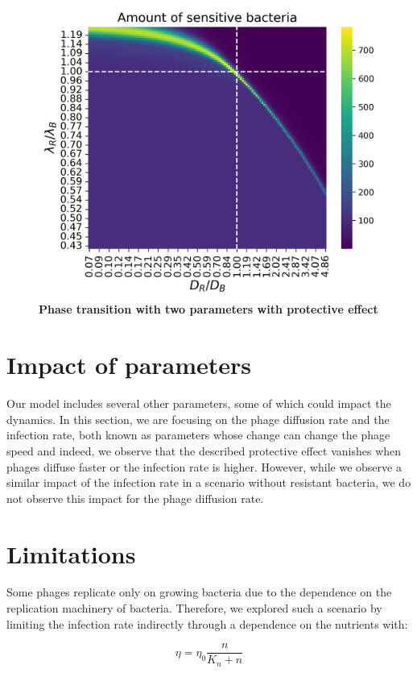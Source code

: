 \begin{figure}
\centering
\includegraphics[width=\linewidth]{graphics/2025_09_26_droplets_fig5.png}
\caption{\textbf{Phase transition with two parameters with protective effect}}
\label{fig:results_heatmap_effect}
\end{figure}

\section{Impact of parameters}
Our model includes several other parameters, some of which could impact the dynamics. In this section, we are focusing on the phage diffusion rate and the infection rate, both known as parameters whose change can change the phage speed and indeed, we observe that the described protective effect vanishes when phages diffuse faster or the infection rate is higher. However, while we observe a similar impact of the infection rate in a scenario without resistant bacteria, we do not observe this impact for the phage diffusion rate. 
\section{Limitations}
Some phages replicate only on growing bacteria due to the dependence on the replication machinery of bacteria. Therefore, we explored such a scenario by limiting the infection rate indirectly through a dependence on the nutrients with:

\begin{equation}
    \eta = \eta_0 \frac{n}{K_n + n}
\end{equation}

